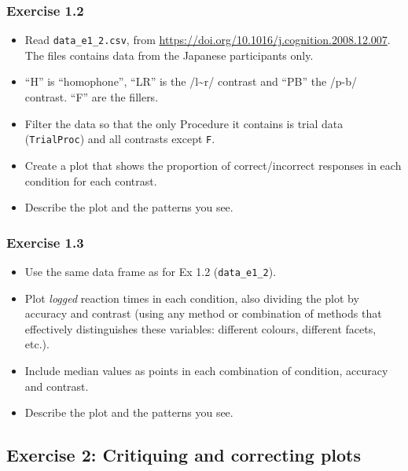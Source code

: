 \documentclass[
]{article}
\providecommand{\tightlist}{%
  \setlength{\itemsep}{0pt}\setlength{\parskip}{0pt}}
\begin{document}
\subsubsection{Exercise 1.2}\label{exercise-1.2}

\begin{itemize}
\tightlist
\item
  Read \texttt{data\_e1\_2.csv}, from
  \url{https://doi.org/10.1016/j.cognition.2008.12.007}. The files
  contains data from the Japanese participants only.
\item
  ``H'' is ``homophone'', ``LR'' is the /l\textasciitilde r/ contrast
  and ``PB'' the /p-b/ contrast. ``F'' are the fillers.
\item
  Filter the data so that the only Procedure it contains is trial data
  (\texttt{TrialProc}) and all contrasts except \texttt{F}.
\item
  Create a plot that shows the proportion of correct/incorrect responses
  in each condition for each contrast.
\item
  Describe the plot and the patterns you see.
\end{itemize}

\subsubsection{Exercise 1.3}\label{exercise-1.3}

\begin{itemize}
\tightlist
\item
  Use the same data frame as for Ex 1.2 (\texttt{data\_e1\_2}).
\item
  Plot \emph{logged} reaction times in each condition, also dividing the
  plot by accuracy and contrast (using any method or combination of
  methods that effectively distinguishes these variables: different
  colours, different facets, etc.).
\item
  Include median values as points in each combination of condition,
  accuracy and contrast.
\item
  Describe the plot and the patterns you see.
\end{itemize}

\newpage

\subsection{Exercise 2: Critiquing and correcting
plots}\label{exercise-2-critiquing-and-correcting-plots}
\end{document}
